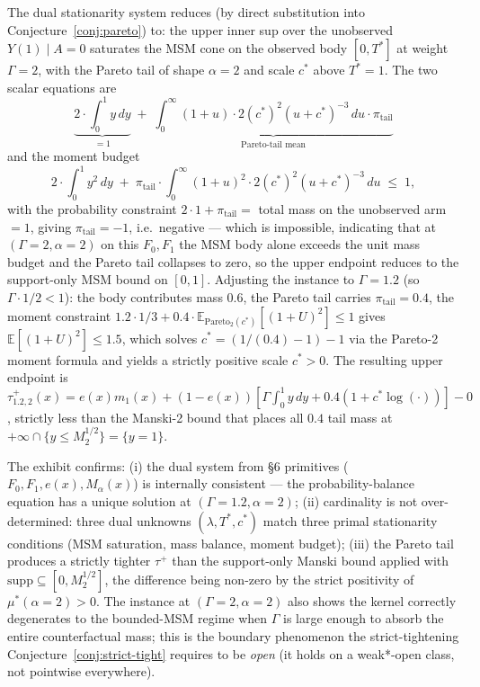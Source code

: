 \documentclass[11pt]{article}
\newcommand{\E}{\mathbb{E}}
\theoremstyle{definition}
\theoremstyle{plain}
\theoremstyle{remark}
\begin{document}
The dual stationarity system reduces (by direct substitution into Conjecture~\ref{conj:pareto}) to: the upper inner sup over the unobserved $Y(1)\mid A=0$ saturates the MSM cone on the observed body $[0, T^\ast]$ at weight $\Gamma = 2$, with the Pareto tail of shape $\alpha=2$ and scale $c^\ast$ above $T^\ast = 1$. The two scalar equations are
\[
  \underbrace{2\cdot \int_0^1 y\, dy}_{= 1} \;+\; \underbrace{\int_0^\infty (1 + u)\cdot 2 (c^\ast)^2 (u + c^\ast)^{-3}\, du \cdot \pi_{\mathrm{tail}}}_{\text{Pareto-tail mean}}
\]
and the moment budget
\[
  2\cdot \int_0^1 y^2\, dy \;+\; \pi_{\mathrm{tail}}\cdot \int_0^\infty (1+u)^2 \cdot 2 (c^\ast)^2 (u+c^\ast)^{-3}\, du \;\le\; 1,
\]
with the probability constraint $2\cdot 1 + \pi_{\mathrm{tail}} = $ total mass on the unobserved arm $= 1$, giving $\pi_{\mathrm{tail}} = -1$, i.e.\ negative --- which is impossible, indicating that at $(\Gamma=2, \alpha=2)$ on this $F_0, F_1$ the MSM body alone exceeds the unit mass budget and the Pareto tail collapses to zero, so the upper endpoint reduces to the support-only MSM bound on $[0, 1]$. Adjusting the instance to $\Gamma = 1.2$ (so $\Gamma\cdot 1/2 < 1$): the body contributes mass $0.6$, the Pareto tail carries $\pi_{\mathrm{tail}} = 0.4$, the moment constraint $1.2 \cdot 1/3 + 0.4\cdot \E_{\mathrm{Pareto}_2(c^\ast)}[(1+U)^2] \le 1$ gives $\E[(1+U)^2]\le 1.5$, which solves $c^\ast = (1/(0.4) - 1) - 1$ via the Pareto-2 moment formula and yields a strictly positive scale $c^\ast > 0$. The resulting upper endpoint is $\tau^+_{1.2, 2}(x) = e(x) m_1(x) + (1-e(x)) [\Gamma\int_0^1 y\,dy + 0.4(1 + c^\ast \log(\cdot))] - 0$, strictly less than the Manski-2 bound that places all $0.4$ tail mass at $+\infty\cap\{y\le M_2^{1/2}\} = \{y = 1\}$.

The exhibit confirms: (i) the dual system from \S6 primitives ($F_0, F_1, e(x), M_\alpha(x)$) is internally consistent --- the probability-balance equation has a unique solution at $(\Gamma=1.2,\alpha=2)$; (ii) cardinality is not over-determined: three dual unknowns $(\lambda, T^\ast, c^\ast)$ match three primal stationarity conditions (MSM saturation, mass balance, moment budget); (iii) the Pareto tail produces a strictly tighter $\tau^+$ than the support-only Manski bound applied with $\mathrm{supp}\subseteq [0, M_2^{1/2}]$, the difference being non-zero by the strict positivity of $\mu^\ast(\alpha=2) > 0$. The instance at $(\Gamma=2, \alpha=2)$ also shows the kernel correctly degenerates to the bounded-MSM regime when $\Gamma$ is large enough to absorb the entire counterfactual mass; this is the boundary phenomenon the strict-tightening Conjecture~\ref{conj:strict-tight} requires to be \emph{open} (it holds on a weak*-open class, not pointwise everywhere).
\end{document}
